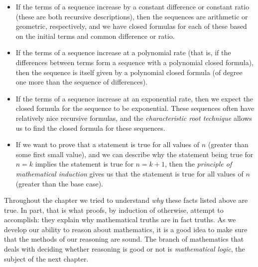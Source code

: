 \documentclass[12pt]{article}
\begin{document}
\begin{itemize}
\item If the terms of a sequence increase by a constant difference or constant ratio (these are both recursive descriptions), then the sequences are arithmetic or geometric, respectively, and we have closed formulas for each of these based on the initial terms and common difference or ratio.
\item If the terms of a sequence increase at a polynomial rate (that is, if the differences between terms form a sequence with a polynomial closed formula), then the sequence is itself given by a polynomial closed formula (of degree one more than the sequence of differences).  
\item If the terms of a sequence increase at an exponential rate, then we expect the closed formula for the sequence to be exponential.  These sequences often have relatively nice recursive formulas, and the \emph{characteristic root technique} allows us to find the closed formula for these sequences.
\item If we want to prove that a statement is true for all values of $n$ (greater than some first small value), and we can describe why the statement being true for $n = k$ implies the statement is true for $n = k+1$, then the \emph{principle of mathematical induction} gives us that the statement is true for all values of $n$ (greater than the base case).  
\end{itemize}

Throughout the chapter we tried to understand \emph{why} these facts listed above are true.  In part, that is what proofs, by induction of otherwise, attempt to accomplish: they explain why mathematical truths are in fact truths.  As we develop our ability to reason about mathematics, it is a good idea to make sure that the methods of our reasoning are sound.  The branch of mathematics that deals with deciding whether reasoning is good or not is \emph{mathematical logic}, the subject of the next chapter.  
\end{document}
